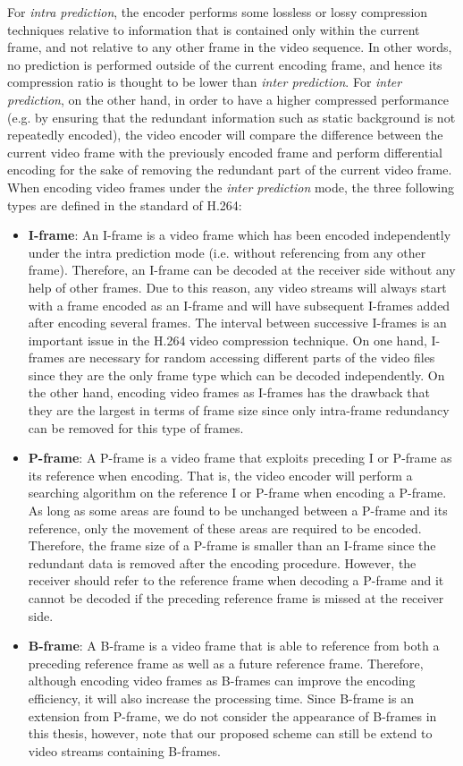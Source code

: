 For \emph{intra prediction}, the encoder performs some lossless or lossy compression techniques relative to information that is contained only within the current frame, and not relative to any other frame in the video sequence.
In other words, no prediction is performed outside of the current encoding frame, and hence its compression ratio is thought to be lower than \emph{inter prediction}.
For \emph{inter prediction}, on the other hand, in order to have a higher compressed performance (e.g. by ensuring that the redundant information such as static background is not repeatedly encoded), the video encoder will compare the difference between the current video frame with the previously encoded frame and perform differential encoding for the sake of removing the redundant part of the current video frame.
When encoding video frames under the \emph{inter prediction} mode, the three following types are defined in the standard of H.264:
\begin{itemize}
\item \textbf{I-frame}:
An I-frame is a video frame which has been encoded independently under the intra prediction mode (i.e. without referencing from any other frame).
Therefore, an I-frame can be decoded at the receiver side without any help of other frames.
Due to this reason, any video streams will always start with a frame encoded as an I-frame and will have subsequent I-frames added after encoding several frames.
The interval between successive I-frames is an important issue in the H.264 video compression technique.
On one hand, I-frames are necessary for random accessing different parts of the video files since they are the only frame type which can be decoded independently.
On the other hand, encoding video frames as I-frames has the drawback that they are the largest in terms of frame size since only intra-frame redundancy can be removed for this type of frames.
\item \textbf{P-frame}:
A P-frame is a video frame that exploits preceding I or P-frame as its reference when encoding.
That is, the video encoder will perform a searching algorithm on the reference I or P-frame when encoding a P-frame.
As long as some areas are found to be unchanged between a P-frame and its reference, only the movement of these areas are required to be encoded.
Therefore, the frame size of a P-frame is smaller than an I-frame since the redundant data is removed after the encoding procedure.
However, the receiver should refer to the reference frame when decoding a P-frame and it cannot be decoded if the preceding reference frame is missed at the receiver side.
\item \textbf{B-frame}:
A B-frame is a video frame that is able to reference from both a preceding reference frame as well as a future reference frame.
Therefore, although encoding video frames as B-frames can improve the encoding efficiency, it will also increase the processing time.
Since B-frame is an extension from P-frame, we do not consider the appearance of B-frames in this thesis, however, note that our proposed scheme can still be extend to video streams containing  B-frames.
\end{itemize}

